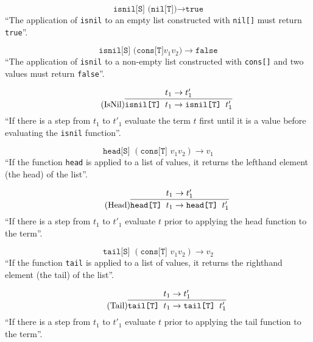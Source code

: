\begin{equation*}
    \tag{IsNil of Nil}
    \texttt{isnil[S] (nil[T])} \rightarrow \texttt{true}
\end{equation*}
``The application of \texttt{isnil} to an empty list constructed
with \texttt{nil[]} must return \texttt{true}''.

\begin{equation*}
    \tag{IsNil of Nil}
    \texttt{isnil[S] (cons[T]} v_1 v_2 \texttt{)} \rightarrow \texttt{false}
\end{equation*}
``The application of \texttt{isnil} to a non-empty list constructed
with \texttt{cons[]} and two values must return \texttt{false}''.

\begin{equation*}
    \tag{IsNil}
    \infer{
        \texttt{isnil[T] } t_1 \rightarrow \texttt{isnil[T] } t'_1
    }{
        t_1 \rightarrow t'_1
    }
\end{equation*}
``If there is a step from $t_1$ to $t'_1$ evaluate the term $t$ first
until it is a value before evaluating the \texttt{isnil} function''.

\begin{equation*}
    \tag{Head of cons}
    \texttt{head[S] } (\texttt{cons[T] } v_1 v_2) \rightarrow v_1
\end{equation*}
``If the function \texttt{head} is applied to a list of values,
it returns the lefthand element (the head) of the list''.

\begin{equation*}
    \tag{Head}
    \infer{
        \texttt{head[T] } t_1 \rightarrow \texttt{head[T] } t'_1
    }{
        t_1 \rightarrow t'_1
    }
\end{equation*}
``If there is a step from $t_1$ to $t'_1$ evaluate $t$ prior to applying
the head function to the term''.

\begin{equation*}
    \tag{Tail of cons}
    \texttt{tail[S] } (\texttt{cons[T] } v_1 v_2) \rightarrow v_2
\end{equation*}
``If the function \texttt{tail} is applied to a list of values,
it returns the righthand element (the tail) of the list''.

\begin{equation*}
    \tag{Tail}
    \infer{
        \texttt{tail[T] } t_1 \rightarrow \texttt{tail[T] } t'_1
    }{
        t_1 \rightarrow t'_1
    }
\end{equation*}
``If there is a step from $t_1$ to $t'_1$ evaluate $t$ prior to applying
the tail function to the term''.

